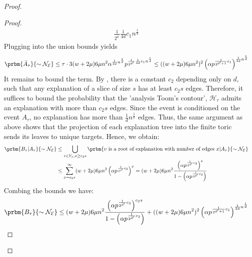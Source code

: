 \begin{proof}
\begin{proof}
    \begin{equation*}
      \begin{split}
\frac{1}{2^{d^{\prime}}} \frac{1}{4d} c_{1} n^{\frac{1}{d}}
      \end{split}
    \end{equation*}
    Plugging into the union bounds yields 
    \begin{equation*}
      \begin{split}
        \prbm{  \bar{A}_{\tau}    }{ \sim \mathcal{N}_{\mathcal{E}} }  \le \tau \cdot 3 (w+2\mu)6\mu n^{2} \alpha^{ \frac{1}{2d} n^{\frac{1}{d}} } p^{ \frac{1}{2^{d^{\prime}}}\frac{1}{4d} c_{1} n^{\frac{1}{d}}} \le ((w+2\mu)6\mu n^{2})^{2} \left( \alpha p^{\frac{1}{2^{d^{\prime} + 1}} c_{1}} \right)^{\frac{1}{2d}n^{\frac{1}{d}}} 
      \end{split}
    \end{equation*}
    It remains to bound the term. By , there is a constant $c_{2}$ depending only on $d$, such that any explanation of a slice of size $s$ has at least $c_{2}s$ edges. Therefore, it suffices to bound the probability that the 'analysis Toom's contour', $\mathcal{H}_{\tau}$ admits an explanation with more than $c_{2}s$ edges. Since the event is conditioned on the event $A_{\tau}$, no explanation has more than $\frac{1}{d}n^{\frac{1}{d}}$ edges. Thus, the same argument as above shows that the projection of each explanation tree into the finite toric sends its leaves to unique targets. Hence, we obtain:
    \begin{equation*}
      \begin{split}
        \prbm{  B_{\tau}  | A_{\tau}  }{ \sim \mathcal{N}_{\mathcal{E}} } & \le \bigcup_{ v \in V_{o}, x \ge c_{2}s } \prbm{ v \text{ is a root of explanation with number of edges } x  | A_{\tau}  }{ \sim \mathcal{N}_{\mathcal{E}} } \\
        & \le \sum_{x = c_{2}s }^{ \infty } (w+2\mu)6\mu n^{2} \left( \alpha p^{\frac{1}{2^{d^{\prime} }} c_{2}} \right)^{x}  = (w+2\mu)6\mu n^{2} \frac{\left( \alpha p^{\frac{1}{2^{d^{\prime} }} c_{2}} \right)^{s}}{ 1 -  \left( \alpha p^{\frac{1}{2^{d^{\prime} }} c_{2}} \right)} 
      \end{split}
    \end{equation*}
Combing the bounds we have:
\begin{equation*}
  \begin{split}
\prbm{  B_{\tau}    }{ \sim \mathcal{N}_{\mathcal{E}} } \le (w+2\mu)6\mu n^{2} \frac{\left( \alpha p^{\frac{1}{2^{d^{\prime} }} c_{2}} \right)^{c_{2}s}}{ 1 -  \left( \alpha p^{\frac{1}{2^{d^{\prime} }} c_{2}} \right)} +  ((w+2\mu)6\mu n^{2})^{2} \left( \alpha p^{\frac{1}{2^{d^{\prime} + 1}} c_{1}} \right)^{\frac{1}{2d}n^{\frac{1}{d}}} 
  \end{split}
\end{equation*}
\end{proof}

\end{proof}


